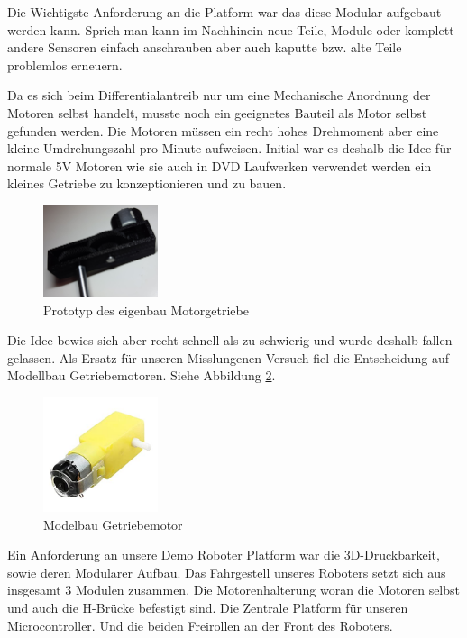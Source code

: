 \begin{flushleft}
    Die Wichtigste Anforderung an die Platform war das diese Modular aufgebaut werden kann. Sprich man kann im Nachhinein
    neue Teile, Module oder komplett andere Sensoren einfach anschrauben aber auch kaputte bzw. alte Teile problemlos erneuern.

    Da es sich beim Differentialantreib nur um eine Mechanische Anordnung der Motoren selbst handelt, musste noch ein
    geeignetes Bauteil als Motor selbst gefunden werden.
    Die Motoren müssen ein recht hohes Drehmoment aber eine kleine Umdrehungszahl pro Minute aufweisen.
    Initial war es deshalb die Idee für normale 5V Motoren wie sie auch in DVD Laufwerken verwendet werden ein kleines
    Getriebe zu konzeptionieren und zu bauen.

    \begin{figure}[h!]
        \centering
        \includegraphics[width=0.3\textwidth]{imgs/Roboter/Real/Getriebe.jpg}
        \caption{Prototyp des eigenbau Motorgetriebe}
        \label{fig:prototyp_transmission}%
    \end{figure}

    Die Idee bewies sich aber recht schnell als zu schwierig und wurde deshalb fallen gelassen.
    Als Ersatz für unseren Misslungenen Versuch fiel die Entscheidung auf Modellbau Getriebemotoren. Siehe Abbildung \ref{fig:robot_motor}.

    \begin{figure}[h!]
        \centering
        \includegraphics[width=0.3\textwidth]{imgs/Roboter/Real/41eJJZ8mOOL._SX342_.jpg}
        \caption{Modelbau Getriebemotor}
        \label{fig:robot_motor}%
    \end{figure}

    Ein Anforderung an unsere Demo Roboter Platform war die 3D-Druckbarkeit, sowie deren Modularer Aufbau.
    Das Fahrgestell unseres Roboters setzt sich aus insgesamt 3 Modulen zusammen.
    Die Motorenhalterung woran die Motoren selbst und auch die H-Brücke befestigt sind.
    Die Zentrale Platform für unseren Microcontroller.
    Und die beiden Freirollen an der Front des Roboters.


\end{flushleft}
